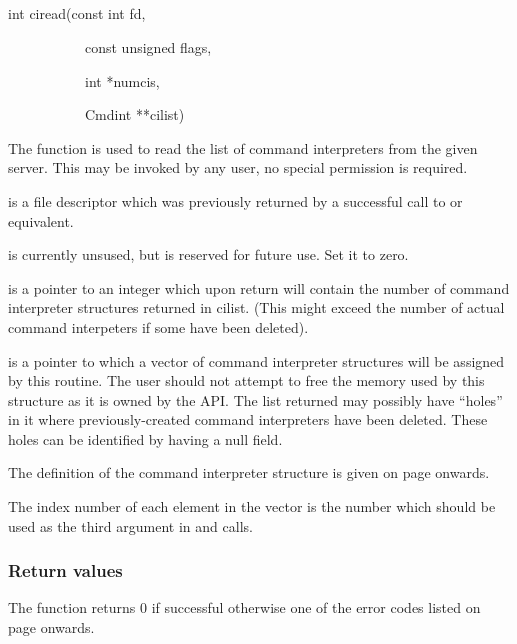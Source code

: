 \subsection{\funcnameXBciread{}}

\begin{expara}

int ciread(const int fd,

\ \ \ \ \ \ \ \ \ \ \ const unsigned flags,

\ \ \ \ \ \ \ \ \ \ \ int *numcis,

\ \ \ \ \ \ \ \ \ \ \ Cmdint **cilist)

\end{expara}

The function \funcXBciread{} is used to read the list of command interpreters from the given server. This may be invoked by
any user, no special permission is required.

 is a file descriptor which was previously returned by a successful call to \funcXBopen{} or equivalent.

 is currently unsused, but is reserved for future use. Set it to zero.

 is a pointer to an integer which upon return will contain the number of command interpreter structures
returned in cilist. (This might exceed the number of actual command interpeters if some have been deleted).

 is a pointer to which a vector of command interpreter structures will be assigned by this routine. The user
should not attempt to free the memory used by this structure as it is owned by the API. The list returned may possibly have
``holes'' in it where previously-created command interpreters have been deleted. These holes can be identified
by having a null  field.

The definition of the command interpreter structure is given on page \pageref{bkm:Cmdinterp} onwards.

The index number of each element in the vector is the number which should be used as the third argument in
\funcXBcidel{} and \funcXBciupd{} calls.

\subsubsection{Return values}
The function returns 0 if successful otherwise one of the error codes listed on page \pageref{errorcodes} onwards.

